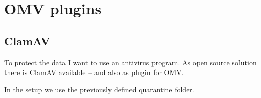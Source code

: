 

\section{OMV plugins}

\subsection{ClamAV}\label{subsec:ClamAV}

To protect the data I want to use an antivirus program. As open source solution
there is \href{https://www.clamav.net}{ClamAV} available -- and also as plugin
for \gls{OMV}.


In the setup we use the previously defined quarantine folder.


